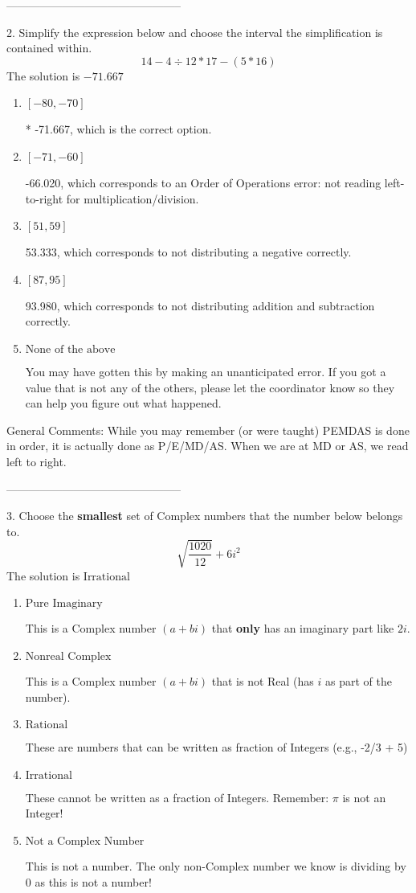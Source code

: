 \documentclass{article}[14pt]
\begin{document}
-----------------------------------------------

2. Simplify the expression below and choose the interval the simplification is contained within.
$$ 14 - 4 \div 12 * 17 - (5 * 16) $$ 
The solution is $ -71.667 $ 

\begin{enumerate}[label=\Alph*.] 
\item $ [-80, -70] $ 

 * -71.667, which is the correct option. 
\item $ [-71, -60] $ 

  -66.020, which corresponds to an Order of Operations error: not reading left-to-right for multiplication/division. 
\item $ [51, 59] $ 

  53.333, which corresponds to not distributing a negative correctly. 
\item $ [87, 95] $ 

  93.980, which corresponds to not distributing addition and subtraction correctly. 
\item $ \text{None of the above} $ 

  You may have gotten this by making an unanticipated error. If you got a value that is not any of the others, please let the coordinator know so they can help you figure out what happened. 
\end{enumerate} 
 
General Comments: While you may remember (or were taught) PEMDAS is done in order, it is actually done as P/E/MD/AS. When we are at MD or AS, we read left to right.

-----------------------------------------------

3. Choose the \textbf{smallest} set of Complex numbers that the number below belongs to.
$$ \sqrt{\frac{1020}{12}}+6i^2 $$ 
The solution is $ \text{Irrational} $ 

\begin{enumerate}[label=\Alph*.] 
\item $ \text{Pure Imaginary} $ 

 This is a Complex number $(a+bi)$ that \textbf{only} has an imaginary part like $2i$. 
\item $ \text{Nonreal Complex} $ 

 This is a Complex number $(a+bi)$ that is not Real (has $i$ as part of the number). 
\item $ \text{Rational} $ 

 These are numbers that can be written as fraction of Integers (e.g., -2/3 + 5) 
\item $ \text{Irrational} $ 

 These cannot be written as a fraction of Integers. Remember: $\pi$ is not an Integer! 
\item $ \text{Not a Complex Number} $ 

 This is not a number. The only non-Complex number we know is dividing by 0 as this is not a number! 
\end{enumerate} 
 
\end{document}
